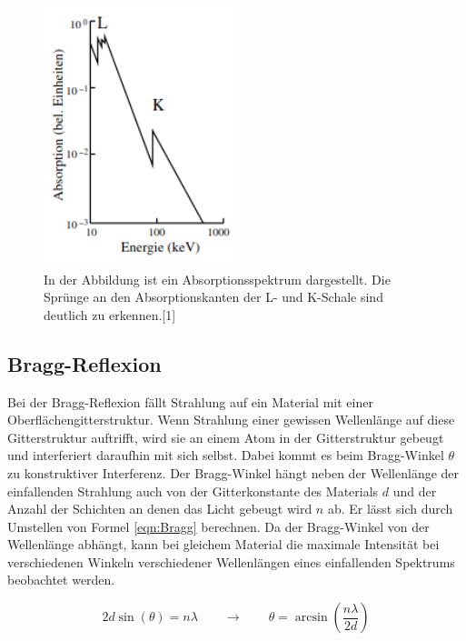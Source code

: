 \documentclass[titlepage = firstcover]{scrartcl}
\begin{document}
            \begin{figure}[h]
              \centering
              \includegraphics[width = 0.5\textwidth]{Kanten.png}
              \caption{In der Abbildung ist ein Absorptionsspektrum dargestellt. Die Sprünge an den Absorptionskanten der L- und K-Schale sind deutlich zu erkennen.[1]}
              \label{fig:SkizzeBragg}
            \end{figure}

            \FloatBarrier



        \subsection{Bragg-Reflexion}
            Bei der Bragg-Reflexion fällt Strahlung auf ein Material mit einer Oberflächengitterstruktur. Wenn Strahlung einer gewissen Wellenlänge auf diese Gitterstruktur auftrifft, wird sie 
            an einem Atom in der Gitterstruktur gebeugt und interferiert daraufhin mit sich selbst. Dabei kommt es beim Bragg-Winkel $\theta$ zu konstruktiver Interferenz. Der Bragg-Winkel hängt
            neben der Wellenlänge der einfallenden Strahlung auch von der Gitterkonstante des Materials $d$ und der Anzahl der Schichten an denen das Licht gebeugt wird $n$ ab. Er lässt sich
            durch Umstellen von Formel \ref{eqn:Bragg} berechnen. Da der Bragg-Winkel von der Wellenlänge abhängt, kann bei gleichem Material die maximale Intensität bei verschiedenen 
            Winkeln verschiedener Wellenlängen eines einfallenden Spektrums beobachtet werden.

            \begin{equation}
              2d\sin(\theta) = n\lambda \qquad \longrightarrow \qquad \theta = \arcsin(\frac{n\lambda}{2d})
              \label{eqn:Bragg}
            \end{equation}
\end{document}
